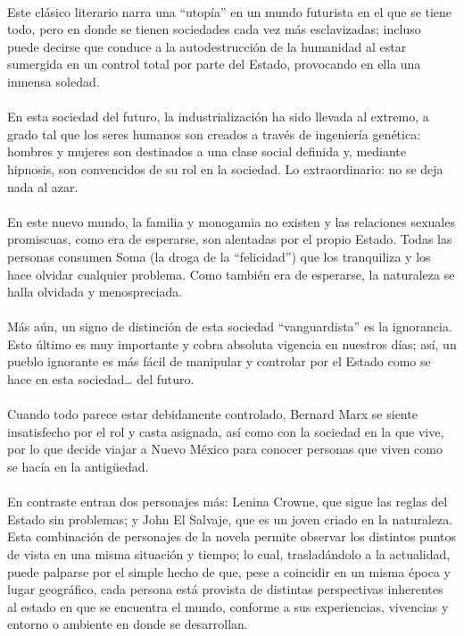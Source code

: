 \documentclass[letterpaper,12pt]{article} %
\begin{document}
    \\
	Este clásico literario narra una “utopía” en un mundo futurista en el que se tiene todo, pero en donde se tienen sociedades cada vez más esclavizadas; incluso puede decirse que conduce a la autodestrucción de la humanidad al estar sumergida en un control total por parte del Estado, provocando en ella una inmensa soledad. \\ \\
	En esta sociedad del futuro, la industrialización ha sido llevada al extremo, a grado tal que los seres humanos son creados a través de ingeniería genética: hombres y mujeres son destinados a una clase social definida y, mediante hipnosis, son convencidos de su rol en la sociedad. Lo extraordinario: no se deja nada al azar. \\ \\
	En este nuevo mundo, la familia y monogamia no existen y las relaciones sexuales promiscuas, como era de esperarse, son alentadas por el propio Estado. Todas las personas consumen Soma (la droga de la “felicidad”) que los tranquiliza y los hace olvidar cualquier problema. Como también era de esperarse, la naturaleza se halla olvidada y menospreciada. \\ \\
	Más aún, un signo de distinción de esta sociedad “vanguardista” es la ignorancia. Esto último es muy importante y cobra absoluta vigencia en nuestros días; así, un pueblo ignorante es más fácil de manipular y controlar por el Estado como se hace en esta sociedad\dots{} del futuro. \\ \\
	Cuando todo parece estar debidamente controlado, Bernard Marx se siente insatisfecho por el rol y casta asignada, así como con la sociedad en la que vive, por lo que decide viajar a Nuevo México para conocer personas que viven como se hacía en la antigüedad. \\ \\
	En contraste entran dos personajes más: Lenina Crowne, que sigue las reglas del Estado sin problemas; y John El Salvaje, que es un joven criado en la naturaleza. Esta combinación de personajes de la novela permite observar los distintos puntos de vista en una misma situación y tiempo; lo cual, trasladándolo a la actualidad, puede palparse por el simple hecho de que, pese a coincidir en un misma época y lugar geográfico, cada persona está provista de distintas perspectivas inherentes al estado en que se encuentra el mundo, conforme a sus experiencias, vivencias y entorno o ambiente en donde se desarrollan.
\end{document}
